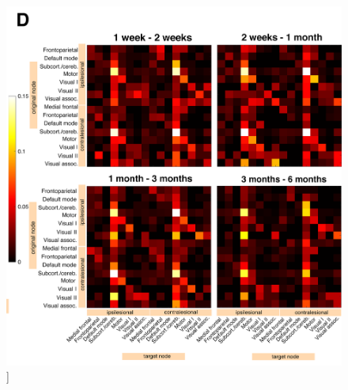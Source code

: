 \documentclass[phd,tocprelim]{cornell}
\renewcommand{\caption}[1]{\singlespacing\hangcaption{#1}\normalspacing}
\begin{document}
\null
\vfill
\clearpage
\null
\vfill
\begin{figure}[h!]
		\ContinuedFloat
		\captionsetup{labelformat=adja-page}
    \centering
    \includegraphics[width=\textwidth]{chapter1/SupplementaryFigure13D.png}
    \caption[]{}
\end{figure}
\null
\vfill
\clearpage
\null
\vfill
\end{document}
